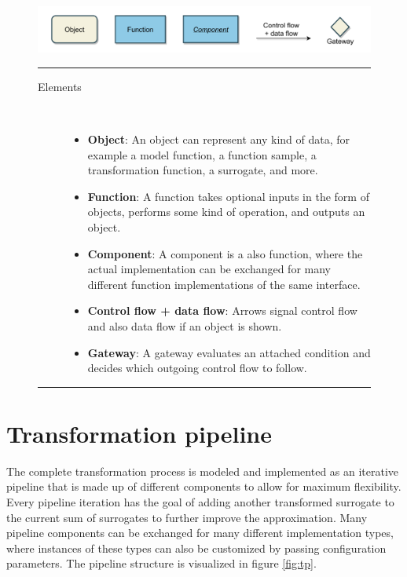 \documentclass[
  a4paper,  %
  twoside,  %
  bibliography=totoc,
  headsepline,
  cleardoublepage=empty,
  parskip=half,
  draft=false
]{scrbook}
\newcommand{\delimit}{{\color{silver}\noindent\rule{\textwidth}{1pt}}}
\begin{document}
\begin{mdframed}[style=style,frametitle={Notation}]
\begin{figure}[H]

\includegraphics[width=\textwidth]{graphics/definitions.pdf}
\vspace{-7.5mm}

\delimit

\vspace{3.5mm}

\begin{description}
\item[Elements] {~ \begin{itemize}[\null]
\item \textbf{Object}: An object can represent any kind of data, for example a model function, a function sample, a transformation function, a surrogate, and more.
\item \textbf{Function}: A function takes optional inputs in the form of objects, performs some kind of operation, and outputs an object.
\item \textbf{Component}: A component is a also function, where the actual implementation can be exchanged for many different function implementations of the same interface.
\item \textbf{Control flow + data flow}: Arrows signal control flow and also data flow if an object is shown.
\item \textbf{Gateway}: A gateway evaluates an attached condition and decides which outgoing control flow to follow.
\end{itemize}}
\end{description}

\delimit

\label{fig:defs}
\end{figure}
\end{mdframed}


\newpage
\section{Transformation pipeline}
\label{sec:tp}

The complete transformation process is modeled and implemented as an iterative pipeline that is made up of different components to allow for maximum flexibility.
Every pipeline iteration has the goal of adding another transformed surrogate to the current sum of surrogates to further improve the approximation.
Many pipeline components can be exchanged for many different implementation types, where instances of these types can also be customized by passing configuration parameters.
The pipeline structure is visualized in figure \cref{fig:tp}.
\end{document}
